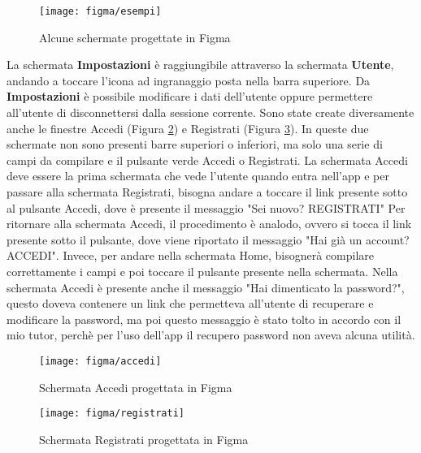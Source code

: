 \begin{figure}[!h]
    \centering 
    \texttt{[image: figma/esempi]} 
    \caption{Alcune schermate progettate in Figma}
    \label{fig:schermatefigma}
\end{figure}
La schermata \textbf{Impostazioni} è raggiungibile attraverso la schermata \textbf{Utente}, andando a toccare l'icona ad ingranaggio posta nella barra superiore.\newline
Da \textbf{Impostazioni} è possibile modificare i dati dell'utente oppure permettere all'utente di disconnettersi dalla sessione corrente.\newline
\newline
Sono state create diversamente anche le finestre Accedi (Figura \ref{fig:accedifigma}) e Registrati (Figura \ref{fig:registratifigma}).\newline
In queste due schermate non sono presenti barre superiori o inferiori, ma solo una serie di campi da compilare e il pulsante verde Accedi o Registrati.\newline
La schermata Accedi deve essere la prima schermata che vede l'utente quando entra nell'app e per passare alla schermata Registrati, bisogna andare a toccare il link presente sotto al pulsante Accedi, dove è presente il messaggio "Sei nuovo? REGISTRATI"
Per ritornare alla schermata Accedi, il procedimento è analodo, ovvero si tocca il link presente sotto il pulsante, dove viene riportato il messaggio "Hai già un account? ACCEDI".\newline
Invece, per andare nella schermata Home, bisognerà compilare correttamente i campi e poi toccare il pulsante presente nella schermata.\newline
\newline
Nella schermata Accedi è presente anche il messaggio "Hai dimenticato la password?", questo doveva contenere un link che permetteva all'utente di recuperare e modificare la password, ma poi questo messaggio è stato tolto in accordo con il mio tutor, perchè per l'uso dell'app il recupero password non aveva alcuna utilità.\newline
\begin{figure}[!h] 
    \centering 
    \texttt{[image: figma/accedi]} 
    \caption{Schermata Accedi progettata in Figma}
    \label{fig:accedifigma}
\end{figure}
\begin{figure}[!h] 
    \centering 
    \texttt{[image: figma/registrati]} 
    \caption{Schermata Registrati progettata in Figma}
    \label{fig:registratifigma}
\end{figure}

